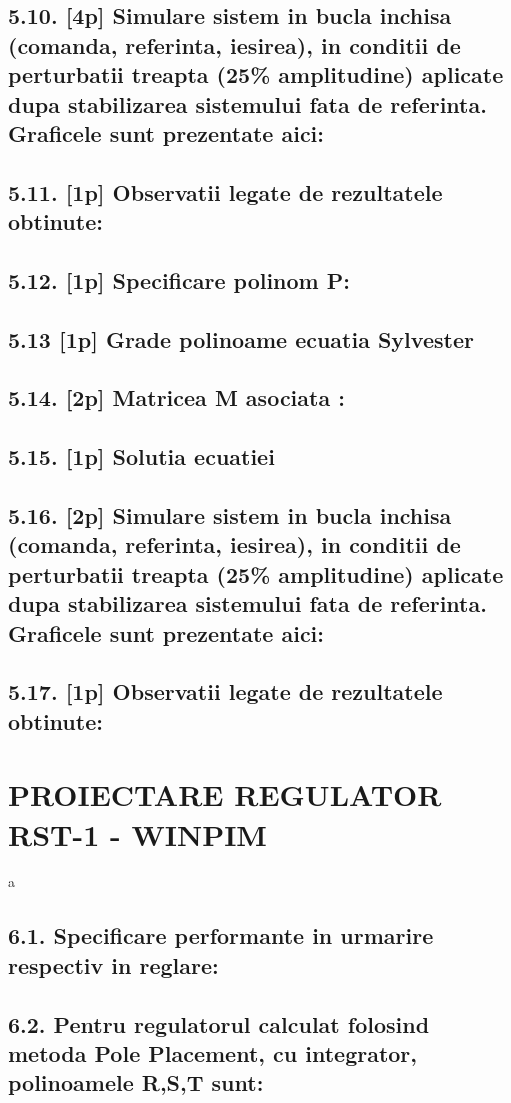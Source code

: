 \documentclass[12pt,english]{article}
\begin{document}
\subsection {5.10. [4p]  Simulare sistem in bucla inchisa (comanda, referinta, iesirea), in conditii de perturbatii treapta (25\% amplitudine) aplicate dupa stabilizarea sistemului fata de referinta. Graficele sunt prezentate aici: }
\subsection {5.11. [1p] Observatii legate de rezultatele obtinute: }
\subsection {5.12. [1p] Specificare polinom P: }
\subsection {5.13 [1p] Grade polinoame ecuatia Sylvester }
\subsection {5.14. [2p]  Matricea M asociata : }
\subsection {5.15. [1p] Solutia ecuatiei}
\subsection {5.16. [2p]  Simulare sistem in bucla inchisa (comanda, referinta, iesirea), in conditii de perturbatii treapta (25\% amplitudine) aplicate dupa stabilizarea sistemului fata de referinta. Graficele sunt prezentate aici: }
\subsection {5.17. [1p] Observatii legate de rezultatele obtinute: }

\section {PROIECTARE REGULATOR RST-1 - WINPIM }
a
\subsection {6.1. Specificare performante in urmarire respectiv in reglare: }
\subsection {6.2. Pentru regulatorul calculat folosind metoda Pole Placement, cu integrator, polinoamele R,S,T sunt: }
\end{document}
